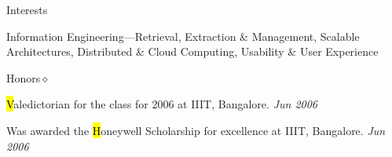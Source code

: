 \documentclass{resume}
\newcommand{\period}{\hfill\small\sl}
\begin{document}
\begin{category}{Interests}{}

    \item Information Engineering---Retrieval, Extraction \&
    Management, Scalable Architectures, Distributed \& Cloud Computing,
    Usability \& User Experience

\end{category}


\begin{category}{Honors}{$\diamond$}

    \item {\hl Valedictorian} for the class for 2006 at IIIT, Bangalore.
    {\period Jun 2006}

    \item Was awarded the {\hl Honeywell Scholarship} for excellence at IIIT,
    Bangalore.
    {\period Jun 2006}

\end{category}
\end{document}

